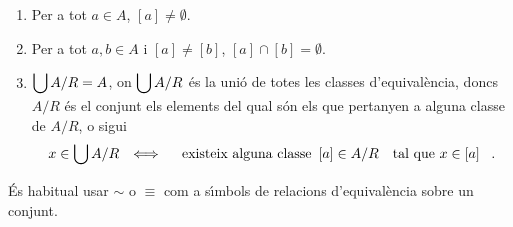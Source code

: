 \begin{enumerate}
\item Per a tot $a\in A$, $\left[ a\right] \neq\emptyset$.

\item Per a tot $a,b\in A$ i $\left[ a\right] \neq\left[ b\right] $, $\left[
a\right] \cap\left[ b\right] =\emptyset$.

\item $\mathop{\displaystyle \bigcup } A/R=A$, on $\mathop{\displaystyle \bigcup } A/R$ \'{e}s la uni\'{o} de totes les
classes d'equival\`{e}ncia, doncs $A/R$ \'{e}s el conjunt els elements del
qual s\'{o}n els que pertanyen a alguna classe de $A/R$, o sigui
\begin{equation*}
\begin{array}{ccc}
x\in\dbigcup A/R & \Longleftrightarrow & \text{existeix alguna classe }\left[
a\right] \in A/R\text{ tal que }x\in\left[ a\right] \text{.}%
\end{array}
\end{equation*}
\end{enumerate}

\'{E}s habitual usar $\sim$ o $\equiv$ com a s\'{\i}mbols de relacions
d'equival\`{e}ncia sobre un conjunt.

